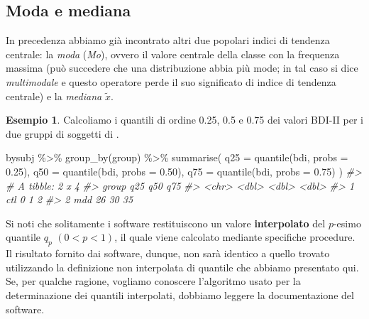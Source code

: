 \documentclass[
  11pt,
  italian,
  a4paper,
  extrafontsizes,onecolumn,openright
  ]{memoir}
\newenvironment{Shaded}{\begin{snugshade}}{\end{snugshade}}
\newcommand{\AttributeTok}[1]{\textcolor[rgb]{0.77,0.63,0.00}{#1}}
\newcommand{\CommentTok}[1]{\textcolor[rgb]{0.56,0.35,0.01}{\textit{#1}}}
\newcommand{\FloatTok}[1]{\textcolor[rgb]{0.00,0.00,0.81}{#1}}
\newcommand{\FunctionTok}[1]{\textcolor[rgb]{0.00,0.00,0.00}{#1}}
\newcommand{\NormalTok}[1]{#1}
\newcommand{\SpecialCharTok}[1]{\textcolor[rgb]{0.00,0.00,0.00}{#1}}
\theoremstyle{definition}
\theoremstyle{definition}
\newtheorem{example}{Esempio}[chapter]
\theoremstyle{definition}
\theoremstyle{definition}
\theoremstyle{remark}
\begin{document}
\hypertarget{moda-e-mediana}{%
\subsection{Moda e mediana}\label{moda-e-mediana}}

In precedenza abbiamo già incontrato altri due popolari indici di
tendenza centrale: la \emph{moda} (\emph{Mo}), ovvero il valore centrale della
classe con la frequenza massima (può succedere che una distribuzione
abbia più mode; in tal caso si dice \emph{multimodale} e questo operatore
perde il suo significato di indice di tendenza centrale) e la \emph{mediana}
\(\tilde{x}\).

\begin{example}

Calcoliamo i quantili di ordine 0.25, 0.5 e 0.75 dei valori BDI-II per i due gruppi di soggetti di \textcite{zetschefuture2019}.

\begin{Shaded}
\begin{Highlighting}[]
\NormalTok{bysubj }\SpecialCharTok{\%\textgreater{}\%} 
  \FunctionTok{group\_by}\NormalTok{(group) }\SpecialCharTok{\%\textgreater{}\%} 
  \FunctionTok{summarise}\NormalTok{(}
    \AttributeTok{q25 =} \FunctionTok{quantile}\NormalTok{(bdi, }\AttributeTok{probs =} \FloatTok{0.25}\NormalTok{),}
    \AttributeTok{q50 =} \FunctionTok{quantile}\NormalTok{(bdi, }\AttributeTok{probs =} \FloatTok{0.50}\NormalTok{),}
    \AttributeTok{q75 =} \FunctionTok{quantile}\NormalTok{(bdi, }\AttributeTok{probs =} \FloatTok{0.75}\NormalTok{)}
\NormalTok{  ) }
\CommentTok{\#\textgreater{} \# A tibble: 2 x 4}
\CommentTok{\#\textgreater{}   group   q25   q50   q75}
\CommentTok{\#\textgreater{}   \textless{}chr\textgreater{} \textless{}dbl\textgreater{} \textless{}dbl\textgreater{} \textless{}dbl\textgreater{}}
\CommentTok{\#\textgreater{} 1 ctl       0     1     2}
\CommentTok{\#\textgreater{} 2 mdd      26    30    35}
\end{Highlighting}
\end{Shaded}

\end{example}

Si noti che solitamente i software restituiscono un valore \textbf{interpolato} del \(p\)-esimo quantile \(q_p\) \((0 < p < 1)\), il quale viene calcolato mediante specifiche procedure. Il risultato fornito dai software, dunque, non sarà identico a quello trovato utilizzando la definizione non interpolata di quantile che abbiamo presentato qui. Se, per qualche ragione, vogliamo conoscere l'algoritmo usato per la determinazione dei quantili interpolati, dobbiamo leggere la documentazione del software.
\end{document}
